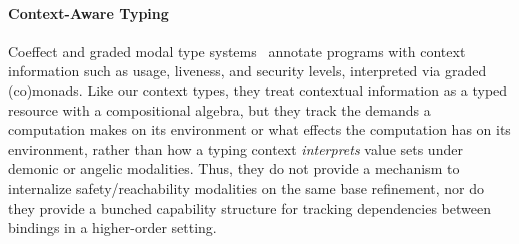 \paragraph{Context-Aware Typing}
Coeffect and graded modal type systems~\cite{Coeffects, Katsumata+14,
  GaboardiCombining, OrchardQuantitative} annotate programs with
context information such as usage, liveness, and security levels,
interpreted via graded (co)monads.  Like our context types, they treat
contextual information as a typed resource with a compositional
algebra, but they track the demands a computation makes on its
environment or what effects the computation has on its environment,
rather than how a typing context \emph{interprets} value sets under
demonic or angelic modalities.  Thus, they do not provide a mechanism
to internalize safety/reachability modalities on the same base
refinement, nor do they provide a bunched capability structure for
tracking dependencies between bindings in a higher-order setting.
